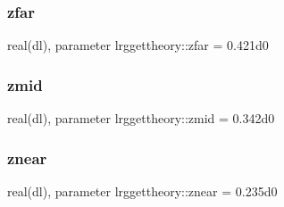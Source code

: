 \subsubsection{\texorpdfstring{zfar}{zfar}}
{\footnotesize\ttfamily real(dl), parameter lrggettheory\+::zfar = 0.\+421d0}

\mbox{\label{namespacelrggettheory_adc42a24b86f4427b3cfcd22912853cfa}} 
\subsubsection{\texorpdfstring{zmid}{zmid}}
{\footnotesize\ttfamily real(dl), parameter lrggettheory\+::zmid = 0.\+342d0}

\mbox{\label{namespacelrggettheory_a8019779a854e5df4d48c67aa0458a991}} 
\subsubsection{\texorpdfstring{znear}{znear}}
{\footnotesize\ttfamily real(dl), parameter lrggettheory\+::znear = 0.\+235d0}

